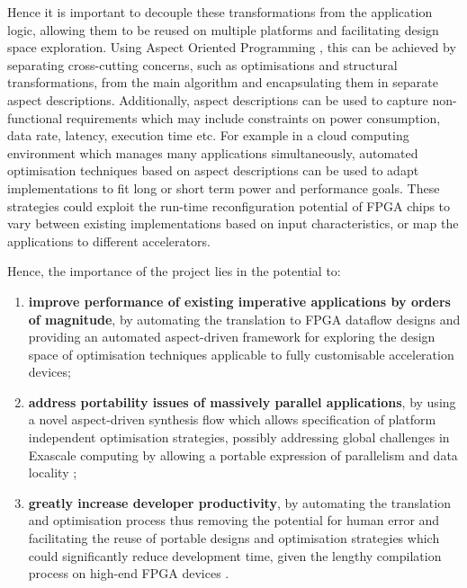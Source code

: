 Hence it is important to decouple these transformations from the
application logic, allowing them to be reused on multiple platforms
and facilitating design space exploration. Using Aspect Oriented
Programming \cite{Kiczales:Lamping:Mendhekar:Maeda:Lopes:1997}, this
can be achieved by separating cross-cutting concerns, such as
optimisations and structural transformations, from the main algorithm
and encapsulating them in separate aspect descriptions.  Additionally,
aspect descriptions can be used to capture non-functional requirements
which may include constraints on power consumption, data rate,
latency, execution time etc. For example in a cloud computing
environment which manages many applications simultaneously, automated
optimisation techniques based on aspect descriptions can be used to
adapt implementations to fit long or short term power and performance
goals. These strategies could exploit the run-time reconfiguration
potential of FPGA chips to vary between existing implementations based
on input characteristics, or map the applications to different
accelerators.

Hence, the importance of the project lies in the potential to:
\begin{enumerate}
\item \textbf{improve performance of existing imperative applications
  by orders of magnitude}, by automating the translation to FPGA
  dataflow designs and providing an automated aspect-driven framework
  for exploring the design space of optimisation techniques applicable
  to fully customisable acceleration devices;

\item \textbf{address portability issues of massively parallel
  applications}, by using a novel aspect-driven synthesis flow which
  allows specification of platform independent optimisation
  strategies, possibly addressing global challenges in Exascale
  computing by allowing a portable expression of parallelism and data
  locality \cite[pp. 46 -- 50]{amarasinghe2009exascale};

\item \textbf{greatly increase developer productivity}, by automating
  the translation and optimisation process thus removing the potential
  for human error and facilitating the reuse of portable designs and
  optimisation strategies which could significantly reduce development
  time, given the lengthy compilation process on high-end FPGA devices
  \cite[pp. 23 -- 28]{Chen:Cong:Pan}.
\end{enumerate}

